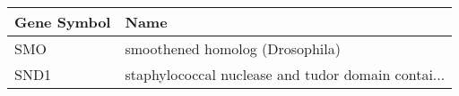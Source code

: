 \begin{tabular}{ll}
\toprule
Gene Symbol &                                               Name \\
\midrule
        SMO &                    smoothened homolog (Drosophila) \\
       SND1 & staphylococcal nuclease and tudor domain contai... \\
\bottomrule
\end{tabular}
